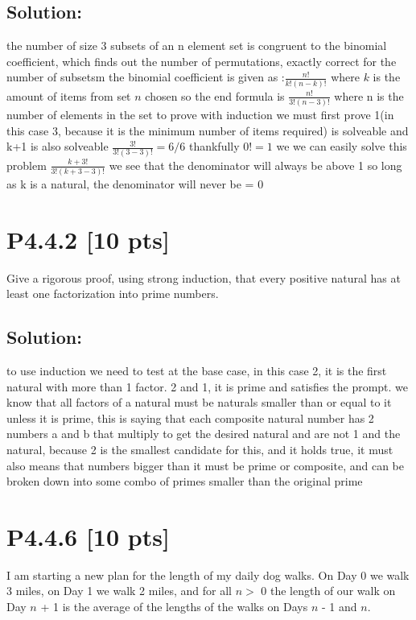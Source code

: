 \documentclass[12pt]{article}
\begin{document}
\subsection*{\textbf{Solution:}}

the number of size 3 subsets of an n element set is congruent to the binomial coefficient, which finds out the number of permutations, exactly correct for the number of subsetsm\newline
the binomial coefficient is given as :$\frac{n!}{k!(n-k)!}$ where $k$ is the amount of items from set $n$ chosen
so the end formula is $\frac{n!}{3!(n-3)!}$ where n is the number of elements in the set\newline
to prove with induction we must first prove 1(in this case 3, because it is the minimum number of items required) is solveable and k+1 is also solveable\newline
$\frac{3!}{3!(3-3)!}=6/6$ thankfully $0!=1$ we we can easily solve this problem\newline
$\frac{k+3!}{3!(k+3-3)!}$ we see that the denominator will always be above 1 so long as k is a natural, the denominator will never be = 0

\newpage
\section*{\textbf{P4.4.2} [10 pts]}
Give a rigorous proof, using strong induction, that every positive natural has at least one factorization into prime numbers.

\subsection*{\textbf{Solution:}}

to use induction we need to test at the base case, in this case 2, it is the first natural with more than 1 factor.
2 and 1, it is prime and satisfies the prompt. we know that all factors of a natural must be naturals smaller than or equal to it unless it is prime, this is saying that each composite natural number has 2 numbers a and b that multiply to get the desired natural and are not 1 and the natural, because 2 is the smallest candidate for this, and it holds true, it must also means that numbers bigger than it must be prime or composite, and can be broken down into some combo of primes smaller than the original prime
\newpage


\section*{\textbf{P4.4.6} [10 pts]}
I am starting a new plan for the length of my daily dog walks. On Day 0 we walk 3 miles, on Day 1 we walk 2 miles, and for all $n >$ 0 the length of our walk on Day $n$ + 1 is the average of the lengths of the walks on Days $n$ - 1 and $n$.
\end{document}
